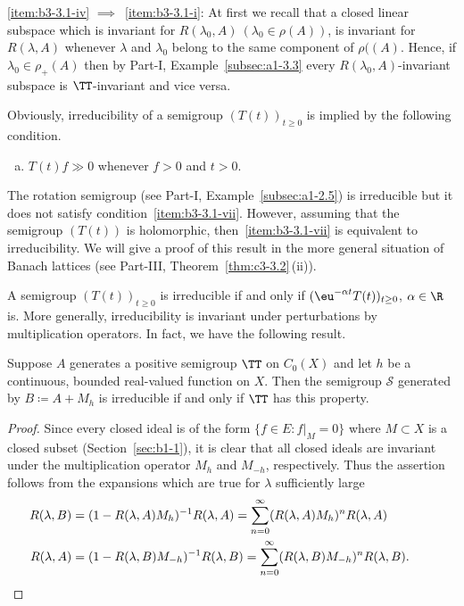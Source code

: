 \ref{item:b3-3.1-iv} $\implies$~\ref{item:b3-3.1-i}: At first we recall that a closed linear subspace which is invariant for $R(\lambda_0,A)\ (\lambda_0 \in \rho(A))$, is invariant for $R(\lambda ,A)$
whenever $\lambda$ and $\lambda_0$ belong to the same component of\/ $\rho((A)$. 
Hence, if\/ $\lambda_0 \in \rho_{+}(A)$ then by Part-I, Example~\ref{subsec:a1-3.3} every $R(\lambda_0,A)$-invariant subspace is $\TT$-invariant and vice versa.
\begin{remark}\label{rem:b3-3.2}
	Obviously, irreducibility of a semigroup $(T(t))_{t\geq 0}$ is implied by the following condition.
\begin{enumerate}[(g)]	
\item\label{item:b3-3.1-vii}
$T(t)f \gg 0$ whenever $f > 0$ and $t > 0$.
\end{enumerate}
The rotation semigroup (see Part-I, Example~\ref{subsec:a1-2.5}) is irreducible but it does not satisfy condition~\ref{item:b3-3.1-vii}.
	However, assuming that the semigroup $(T(t))$ is holomorphic, then~\ref{item:b3-3.1-vii}
	is equivalent to irreducibility.
	We will give a proof of this result in the more general situation of Banach lattices (see Part-III, Theorem~\ref{thm:c3-3.2}\,(ii)).
\end{remark}
A semigroup $(T(t))_{t  \geq 0}$ is irreducible if and only if\/ $(\eu^{-\alpha t}T(t))_{t  \geq 0}$, $\alpha \in \R$  is. 
More generally, irreducibility is invariant under perturbations by multiplication operators. 
In fact, we have the following result. 
\begin{proposition}\label{prop:b3-3.3}
%
	Suppose $A$ generates a positive semigroup $\TT$ on $C_{0}(X)$ and let $h$ be a continuous, bounded real-valued function on $X$.
	Then the semigroup $\mathcal{S}$ generated by $B \coloneqq A + M_{h}$ is irreducible if and only if\/ $\TT$ has this property.
\end{proposition}
\begin{proof}
	Since every closed ideal is of the form $\{f \in E \colon f|_{M} = 0\}$ where $M \subset X$ is a closed subset (\cf Section~\ref{sec:b1-1}), it is clear that all closed ideals are invariant under the multiplication operator $M_{h}$ and $M_{-h}$, respectively.
	Thus the assertion follows from the expansions which are true for $\lambda$ sufficiently large
\begin{align*}
R(\lambda,B) &= (1 - R(\lambda,A)M_{h})^{-1}R(\lambda,A) 
	= \sum_{n=0}^{\infty} (R(\lambda,A)M_{h})^{n}R(\lambda,A) \\
R(\lambda,A) &= (1 - R(\lambda,B)M_{-h})^{-1}R(\lambda,B) = \sum_{n=0}^{\infty} (R(\lambda,B)M_{-h})^{n}R(\lambda,B).
&&\qedhere
\end{align*} 
\end{proof}
